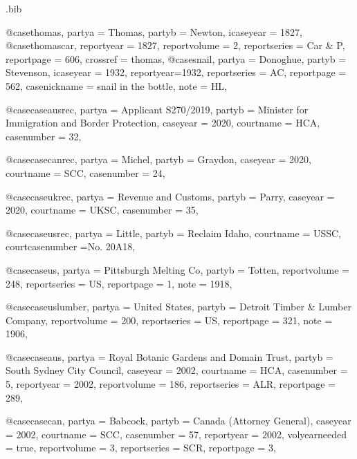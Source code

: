 \begin{filecontents*}[overwrite]{\jobname.bib}


@case{thomas,
  partya = {Thomas},
  partyb = {Newton},
  icaseyear = {1827},
	}
@case{thomascar,
  reportyear = {1827},
  reportvolume = {2},
  reportseries = {Car \& P},
  reportpage = {606},
  crossref = {thomas},
}
@case{snail,
  partya = {Donoghue}, 
  partyb = {Stevenson},
  icaseyear = {1932},
  reportyear={1932},
  reportseries = {AC},
  reportpage = {562},
  casenickname = {snail in the bottle},
  note = {HL},
	}



@case{caseausrec,
  partya = {Applicant S270/2019}, 
  partyb = {Minister for Immigration and Border Protection},
  caseyear = {2020},
  courtname = {HCA},
  casenumber = {32},
	}

@case{casecanrec,
  partya = {Michel}, 
  partyb = {Graydon},
  caseyear = {2020},
  courtname = {SCC},
  casenumber = {24},
	}


@case{caseukrec,
  partya = {Revenue and Customs}, 
  partyb = {Parry},
  caseyear = {2020},
  courtname = {UKSC},
  casenumber = {35},
	}

@case{caseusrec,
  partya = {Little}, 
  partyb = {Reclaim Idaho},
  courtname = {USSC},
  courtcasenumber ={No. 20A18},
	}

@case{caseus,
  partya = {Pittsburgh Melting Co},
  partyb = {Totten},
  reportvolume = {248},
  reportseries = {US},
  reportpage = {1},
  note = {1918},
}

@case{caseuslumber,
  partya = {United States},
  partyb = {Detroit Timber \& Lumber Company},
  reportvolume = {200},
  reportseries = {US},
  reportpage = {321},
  note = {1906},
}

@case{caseaus,
  partya = {Royal Botanic Gardens and Domain Trust}, 
  partyb = {South Sydney City Council},
  caseyear = {2002},
  courtname = {HCA},
  casenumber = {5},
  reportyear = {2002},
  reportvolume = {186},
  reportseries = {ALR},
  reportpage = {289},
	}

@case{casecan,
  partya = {Babcock}, 
  partyb = {Canada (Attorney General)},
  caseyear = {2002},
  courtname = {SCC},
  casenumber = {57},
  reportyear = {2002},
  volyearneeded = {true},
  reportvolume = {3},
  reportseries = {SCR},
  reportpage = {3},
	}



\end{filecontents*}
